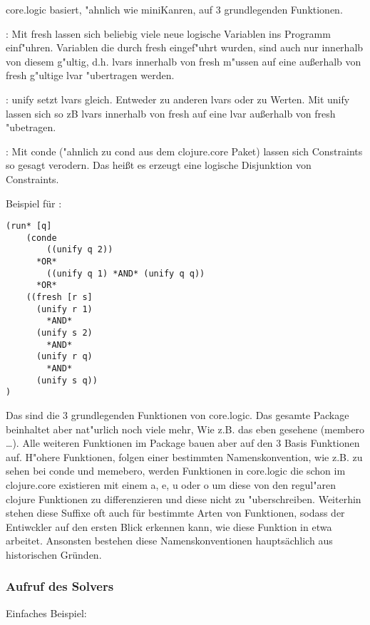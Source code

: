 core.logic basiert, "ahnlich wie miniKanren, auf 3 grundlegenden Funktionen.
\begin{description}
\item{:}
Mit fresh lassen sich beliebig viele neue logische Variablen ins Programm einf"uhren. Variablen die durch fresh eingef"uhrt wurden, sind auch nur innerhalb von diesem g"ultig, d.h. lvars innerhalb von fresh m"ussen auf eine au\ss{}erhalb von fresh g"ultige lvar "ubertragen werden.

\item{:}
unify setzt lvars gleich. Entweder zu anderen lvars oder zu Werten. Mit unify lassen sich so zB lvars innerhalb von fresh auf eine lvar au\ss{}erhalb von fresh "ubetragen.

\item{:}
Mit conde ("ahnlich zu cond aus dem clojure.core Paket) lassen sich Constraints so gesagt \dq{}verodern\dq{}. Das heißt es erzeugt eine logische Disjunktion von Constraints.
\end{description}
Beispiel für :
\begin{lstlisting}
(run* [q]
    (conde
        ((unify q 2))
	  *OR*
        ((unify q 1) *AND* (unify q q))
	  *OR*
	((fresh [r s] 
	  (unify r 1)
	    *AND*
	  (unify s 2)
	    *AND*
	  (unify r q)
	    *AND*
	  (unify s q))
)
\end{lstlisting}
Das sind die 3 grundlegenden Funktionen von core.logic. Das gesamte Package beinhaltet aber nat"urlich noch viele mehr, Wie z.B. das eben gesehene (membero \dots{}). Alle weiteren Funktionen im Package bauen aber auf den 3 Basis Funktionen auf. H"ohere Funktionen, folgen einer bestimmten Namenskonvention, wie z.B. zu sehen bei conde und memebero, werden Funktionen in core.logic die schon im clojure.core existieren mit einem a, e, u oder o um diese von den regul"aren clojure Funktionen zu differenzieren und diese nicht zu "uberschreiben. Weiterhin stehen diese Suffixe oft auch für bestimmte Arten von Funktionen, sodass der Entiwckler auf den ersten Blick erkennen kann, wie diese Funktion in etwa arbeitet. Ansonsten bestehen diese Namenskonventionen hauptsächlich aus historischen Gründen.


\subsubsection{Aufruf des Solvers}

Einfaches Beispiel:


